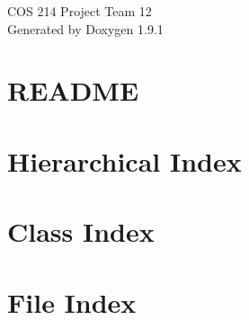 \let\mypdfximage\pdfximage\def\pdfximage{\immediate\mypdfximage}\documentclass[twoside]{book}
\newcommand{\+}{\discretionary{\mbox{\scriptsize$\hookleftarrow$}}{}{}}
\newcommand{\clearemptydoublepage}{%
  \newpage{\pagestyle{empty}\cleardoublepage}%
}
\begin{document}
\raggedbottom

\hypersetup{pageanchor=false,
             bookmarksnumbered=true,
             pdfencoding=unicode
            }
\begin{titlepage}
\vspace*{7cm}
\begin{center}%
{\Large COS 214 Project Team 12 }\\
\vspace*{1cm}
{\large Generated by Doxygen 1.9.1}\\
\end{center}
\end{titlepage}
\clearemptydoublepage
{}
\tableofcontents
\clearemptydoublepage
{}
\hypersetup{pageanchor=true}

\chapter{README}
\label{md_COS214_Poject_src_README}

\chapter{Hierarchical Index}

\chapter{Class Index}

\chapter{File Index}

\end{document}
